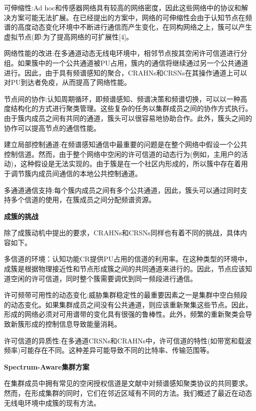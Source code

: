 \documentclass[a4paper,AutoFakeBold,oneside,12pt]{book}
\begin{document}
 可伸缩性:Ad hoc和传感器网络具有较高的网络密度，因此这些网络中的协议和解决方案可能无法扩展。在已经提出的方案中，网络的可伸缩性会由于认知节点在频谱的高度动态变化环境中不断进行通信而产生变化，在同构网络之上，簇可以产生虚拟节点(即:为了提高网络的可扩展性[4]。

  网络性能的改进:在多通道动态无线电环境中，相邻节点按其空闲许可信道进行分组。如果簇中的一个公共通道被PU占用，簇内的通信将继续通过另一个公共通道进行。因此，由于具有频谱感知的聚合，CRAHNs和CRSNs在其操作通道上可以对PU到达者免疫，从而提高了网络性能。

  节点间的协作:认知周期循环，即频谱感知、频谱决策和频谱切换，可以以一种高度结构化的方式进行聚类管理。这些复杂的任务以集群成员之间的协作方式执行。由于簇内成员之间有共同的通道，簇头可以很容易地协助合作。此外，簇头之间的协作可以提高节点的通信性能。

  建立局部控制通道:在频谱感知通信中最重要的问题是在整个网络中假设一个公共控制信道。然而，由于整个网络中空闲的许可信道的动态行为(例如，主用户的活动)，这种假设是无法实现的。由于簇是在一个社区内形成的，所以簇中存在着用于调节簇内成员间通信的本地公共控制通道。

  多通道通信支持:每个簇内成员之间有多个公共通道，因此，簇头可以通过同时支持多个信道的使用，在簇成员之间分配频谱资源。

\begin{center}
\textbf{成簇的挑战}
\end{center}

  除了成簇动机中提出的要求，CRAHNs和CRSNs同样也有着不同的挑战，具体内容如下。

  多信道的环境：认知功能CR提供PU占用的信道的利用率。在这种类型的环境中，成簇是根据物理接近性和节点形成簇之间的共同通道来进行的。因此，节点应该知道空闲的许可信道，同时整个簇需要调优到同一频段进行通信。

  许可频带可用性的动态变化:威胁集群稳定性的最重要因素之一是集群中空白频段的动态变化。如果集群成员之间没有公共通道，则应该重新聚集这些节点。因此，形成的网络必须对可用谱带的变化具有很强的鲁棒性。此外，频繁的重新聚类会导致新簇形成的控制信息导致能量消耗。

  许可信道的异质性:在多通道CRSNs和CRAHNs中，许可信道的特性(如带宽和载波频率)可能存在不同。这种差异可能导致不同的比特率、传输范围等。

\begin{center}
\textbf{Spectrum-Aware集群方案}
\end{center}

  在集群成员中拥有常见的空闲授权信道是文献中对频谱感知聚类协议的共同要求。然而，在形成集群的同时，它们在邻近区域有不同的方法。我们概述了最近在动态无线电环境中成簇的现有方法。
\end{document}
